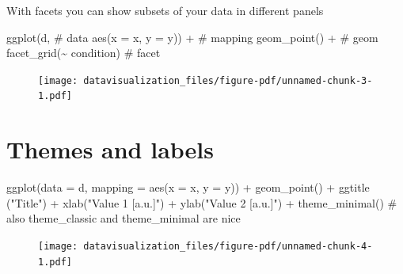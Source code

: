 \documentclass[
  letterpaper,
  DIV=11,
  numbers=noendperiod,
  oneside]{scrreprt}
\newenvironment{Shaded}{\begin{snugshade}}{\end{snugshade}}
\newcommand{\AttributeTok}[1]{\textcolor[rgb]{0.40,0.45,0.13}{#1}}
\newcommand{\CommentTok}[1]{\textcolor[rgb]{0.37,0.37,0.37}{#1}}
\newcommand{\FunctionTok}[1]{\textcolor[rgb]{0.28,0.35,0.67}{#1}}
\newcommand{\NormalTok}[1]{\textcolor[rgb]{0.00,0.23,0.31}{#1}}
\newcommand{\SpecialCharTok}[1]{\textcolor[rgb]{0.37,0.37,0.37}{#1}}
\newcommand{\StringTok}[1]{\textcolor[rgb]{0.13,0.47,0.30}{#1}}
\begin{document}
With facets you can show subsets of your data in different panels

\begin{Shaded}
\begin{Highlighting}[]
\FunctionTok{ggplot}\NormalTok{(d, }\CommentTok{\# data}
       \FunctionTok{aes}\NormalTok{(}\AttributeTok{x =}\NormalTok{ x, }\AttributeTok{y =}\NormalTok{ y)) }\SpecialCharTok{+} \CommentTok{\# mapping}
    \FunctionTok{geom\_point}\NormalTok{() }\SpecialCharTok{+} \CommentTok{\# geom }
    \FunctionTok{facet\_grid}\NormalTok{(}\SpecialCharTok{\textasciitilde{}}\NormalTok{ condition) }\CommentTok{\# facet}
\end{Highlighting}
\end{Shaded}

\begin{figure}[H]

{\centering \texttt{[image: datavisualization\_files/figure-pdf/unnamed-chunk-3-1.pdf]}

}

\end{figure}

\hypertarget{themes-and-labels}{%
\section{Themes and labels}\label{themes-and-labels}}

\begin{Shaded}
\begin{Highlighting}[]
\FunctionTok{ggplot}\NormalTok{(}\AttributeTok{data =}\NormalTok{ d,}
       \AttributeTok{mapping =} \FunctionTok{aes}\NormalTok{(}\AttributeTok{x =}\NormalTok{ x,}
                     \AttributeTok{y =}\NormalTok{ y)) }\SpecialCharTok{+}
    \FunctionTok{geom\_point}\NormalTok{() }\SpecialCharTok{+}
    \FunctionTok{ggtitle}\NormalTok{ (}\StringTok{"Title"}\NormalTok{) }\SpecialCharTok{+}
    \FunctionTok{xlab}\NormalTok{(}\StringTok{"Value 1 [a.u.]"}\NormalTok{) }\SpecialCharTok{+}
    \FunctionTok{ylab}\NormalTok{(}\StringTok{"Value 2 [a.u.]"}\NormalTok{) }\SpecialCharTok{+}
    \FunctionTok{theme\_minimal}\NormalTok{() }\CommentTok{\# also theme\_classic and theme\_minimal are nice}
\end{Highlighting}
\end{Shaded}

\begin{figure}[H]

{\centering \texttt{[image: datavisualization\_files/figure-pdf/unnamed-chunk-4-1.pdf]}

}

\end{figure}
\end{document}
